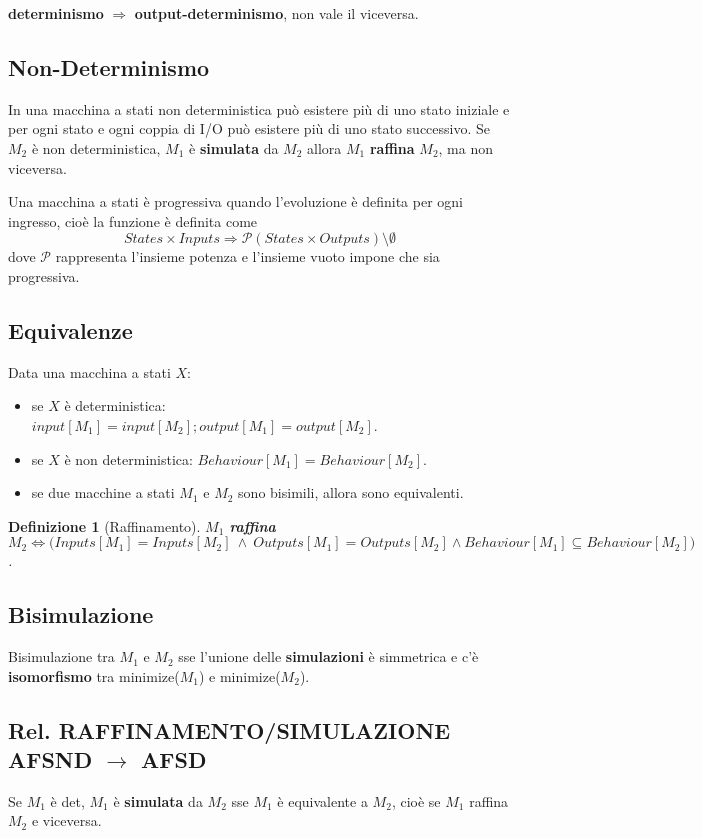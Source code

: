 \documentclass[a4paper]{article}
\newtheorem{definit}{Definizione}[subsection]
\begin{document}
\begin{center}
\textbf{determinismo} $\Rightarrow$ \textbf{output-determinismo}, non vale il viceversa.
\end{center}

\subsection{Non-Determinismo}
In una macchina a stati non deterministica può esistere più di uno stato iniziale e per ogni stato e ogni coppia di I/O può esistere più di uno stato successivo. Se $M_2$ è non deterministica, $M_1$ è \textbf{simulata} da $M_2$ allora $M_1$ \textbf{raffina} $M_2$, ma non viceversa.


Una macchina a stati è progressiva quando l'evoluzione è definita per ogni ingresso, cioè la funzione è definita come \[States \times Inputs \Rightarrow \mathcal{P}(States \times Outputs) \setminus \emptyset \] dove $\mathcal{P}$ rappresenta l'insieme potenza e l'insieme vuoto impone che sia progressiva.

\subsection{Equivalenze}
Data una macchina a stati $X$:
\begin{itemize}
\item se $X$ è deterministica: $input[M_1]=input[M_2]; output[M_1]=output[M_2]$.
\item se $X$ è non deterministica: $Behaviour[M_1]=Behaviour[M_2]$.
\item se due macchine a stati $M_1$ e $M_2$ sono bisimili, allora sono equivalenti.
\end{itemize}

\begin{definit}[Raffinamento]
	$M_1$ \textbf{raffina} $M_2 \Leftrightarrow  \Big(Inputs[M_1]=Inputs[M_2]\ \wedge\ Outputs[M_1]=Outputs[M_2] \wedge Behaviour[M_1] \subseteq Behaviour[M_2]\Big)$.
\end{definit}


\subsection{Bisimulazione}
Bisimulazione tra $M_1$ e $M_2$ sse l'unione delle \textbf{simulazioni} è simmetrica e c'è \textbf{isomorfismo} tra minimize($M_1$) e minimize($M_2$).

\subsection{Rel. RAFFINAMENTO/SIMULAZIONE AFSND $\rightarrow$ AFSD} Se $M_1$ è det, $M_1$ è \textbf{simulata} da $M_2$ sse $M_1$ è equivalente a $M_2$, cioè se $M_1$ raffina $M_2$ e viceversa.
\end{document}
